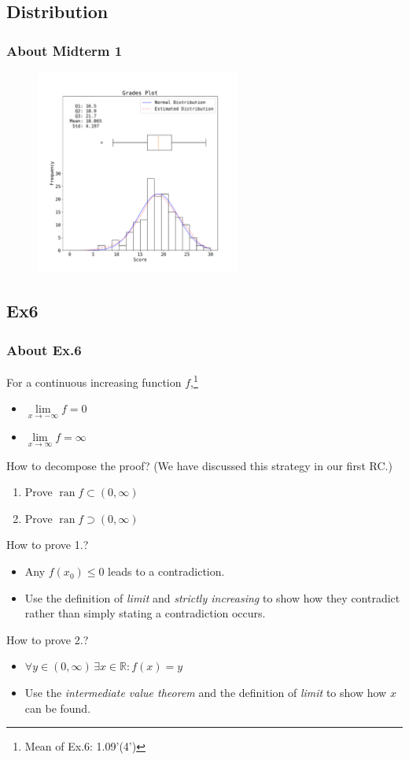\documentclass[10pt, t]{beamer}
\renewcommand{\emph}[1]{{\color{themecolor}\textsl{#1}}}
\newcommand{\R}{\mathbb{R}}
\begin{document}
\subsection{Distribution}
\begin{frame}
    \frametitle{About Midterm 1}

    \begin{figure}[H]
        \centering
        \includegraphics[width=0.6\textwidth]{./mid1dist.pdf}
    \end{figure}

\end{frame}

\subsection{Ex6}
\begin{frame}
    \frametitle{About Ex.6}
    For a continuous increasing function $f$,\footnote[frame]{Mean of Ex.6: 1.09'(4')}
    \begin{itemize}
        \item $\underset{x\to -\infty}{\lim}f=0$
        \item $\underset{x\to \infty}{\lim}f=\infty$
    \end{itemize}
    How to decompose the proof? (We have discussed this strategy in our first RC.)
    \begin{enumerate}
        \item Prove $\operatorname{ran} f\subset (0,\infty)$
        \item Prove $\operatorname{ran} f\supset (0,\infty)$
    \end{enumerate}
    How to prove 1.?
    \begin{itemize}
        \item Any $f(x_0)\leq 0$ leads to a contradiction.
        \item Use the definition of \emph{limit} and \emph{strictly increasing} to show how they contradict rather than simply stating a contradiction occurs.
    \end{itemize}
    How to prove 2.?
    \begin{itemize}
        \item $\forall y\in(0,\infty)\,\exists x\in \R :f(x)=y$
        \item Use the \emph{intermediate value theorem} and the definition of \emph{limit} to show how $x$ can be found.
    \end{itemize}
\end{frame}
\end{document}
